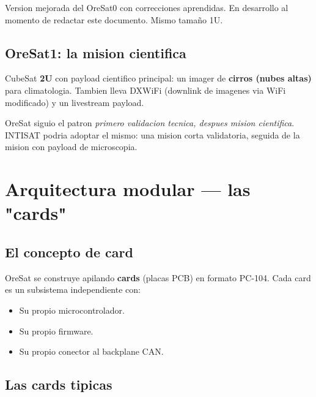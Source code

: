 \documentclass[11pt,a4paper,oneside]{report}
\begin{document}
Version mejorada del OreSat0 con correcciones aprendidas. En desarrollo
al momento de redactar este documento. Mismo tamaño 1U.

\section{OreSat1: la mision cientifica}

CubeSat \textbf{2U} con payload cientifico principal: un imager de
\textbf{cirros (nubes altas)} para climatologia. Tambien lleva DXWiFi
(downlink de imagenes via WiFi modificado) y un livestream payload.

\begin{leccion}
OreSat siguio el patron \emph{primero validacion tecnica, despues mision
cientifica}. INTISAT podria adoptar el mismo: una mision corta validatoria,
seguida de la mision con payload de microscopia.
\end{leccion}

\chapter{Arquitectura modular --- las "cards"}

\section{El concepto de card}

OreSat se construye apilando \textbf{cards} (placas PCB) en formato
PC-104. Cada card es un subsistema independiente con:

\begin{itemize}[leftmargin=2em]
  \item Su propio microcontrolador.
  \item Su propio firmware.
  \item Su propio conector al backplane CAN.
\end{itemize}

\section{Las cards tipicas}
\end{document}
